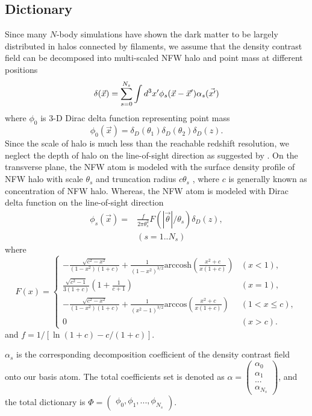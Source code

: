 \documentclass[twocolumn]{aastex62}
\begin{document}
\subsection{Dictionary}
Since many $N$-body simulations have shown the dark matter to be largely distributed in halos connected by filaments,
we assume that the density contrast field can be decomposed into multi-scaled NFW halo \citep{halo-NFW1997ApJ} and point mass at different positions
\begin{equation}
\delta(\vec{x}) = \sum_{s=0}^{N_s} \int d^3 x' \phi_s(\vec{x}-\vec{x}') \alpha_s(\vec{x'})\\
\end{equation}
where $\phi_0$ is $3$-D Dirac delta function representing point mass
\begin{equation}
\phi_0(\vec{x})= \delta_D(\theta_1) \delta_D(\theta_2) \delta_D(z).
\end{equation}
Since the scale of halo is much less than the reachable redshift resolution, we neglect the depth of halo on the line-of-sight direction as suggested by \citep{massMap-Glimpse3D2014}.
On the transverse plane, the NFW atom is modeled with the surface density profile of NFW halo with scale $\theta_s$ and truncation radius $c \theta_s$ \citep{haloModel-TJ2003-3pt}, where $c$ is generally known as concentration of NFW halo.  Whereas, the NFW atom is modeled with Dirac delta function on the line-of-sight direction
\begin{equation}
\begin{split}
\phi_s(\vec{x}) =&\frac{f }{2 \pi \theta_s^2 } F(|\vec{\theta}|/\theta_s) \delta_D(z),\\
&  (s=1..N_s)
\end{split}
\end{equation}
where
\begin{equation}
F(x)=
\begin{cases}
-\frac{\sqrt{c^2-x^2}}{(1-x^2)(1+c)} + \frac{1}{(1-x^2)^{3/2}} \mathrm{arccosh} (\frac{x^2+c}{x(1+c)}) & (x<1),\\
\frac{\sqrt{c^2-1}}{3(1+c)} (1+\frac{1}{c+1}) & (x=1),\\
-\frac{\sqrt{c^2-x^2}}{(1-x^2)(1+c)} + \frac{1}{(x^2-1)^{3/2}} \mathrm{arccos} (\frac{x^2+c}{x(1+c)}) & (1<x\leq c),\\
0& (x>c).
\end{cases}
\end{equation}
and $f=1/[\ln (1+c)-c/(1+c)]$.

$\alpha_s$ is the corresponding decomposition coefficient of the density contrast field onto our basis atom. The total coefficients set is denoted as $\alpha=\begin{pmatrix}
\alpha_0\\
\alpha_1\\
...\\
\alpha_{N_s}
\end{pmatrix}$, and the total dictionary is $\Phi=\begin{pmatrix}
\phi_0, \phi_1, ..., \phi_{N_s}
\end{pmatrix}$.
\end{document}
